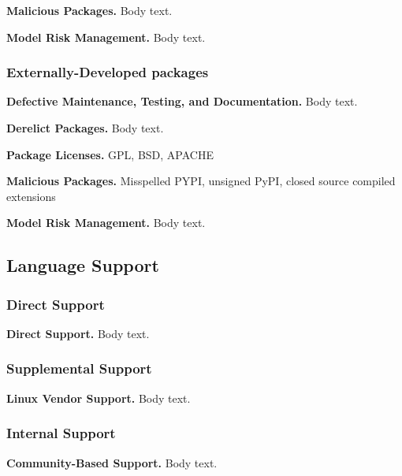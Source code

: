                 \textbf{Malicious Packages.}
                Body text.

                \textbf{Model Risk Management.}
                Body text.
                
            \subsubsection{Externally-Developed packages}

                \textbf{Defective Maintenance, Testing, and Documentation.}
                Body text.

                \textbf{Derelict Packages.}
                Body text.

                \textbf{Package Licenses.}
                GPL, BSD, APACHE

                \textbf{Malicious Packages.}
                Misspelled PYPI, unsigned PyPI, closed source compiled extensions

                \textbf{Model Risk Management.}
                Body text.

        \subsection{Language Support}
 
            \subsubsection{Direct Support}

                \textbf{Direct Support.}
                Body text.

            \subsubsection{Supplemental Support}

                \textbf{Linux Vendor Support.}
                Body text.

            \subsubsection{Internal Support}
                            
                \textbf{Community-Based Support.}
                Body text.
